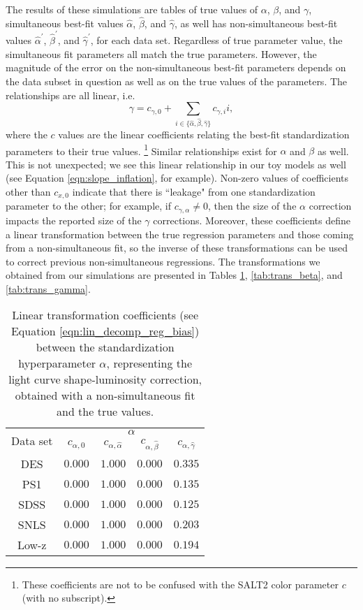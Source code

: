 The results of these simulations are tables of true values of $\alpha$, $\beta$, and $\gamma$, simultaneous best-fit values $\hat{\alpha}$, $\hat{\beta}$, and $\hat{\gamma}$, as well has non-simultaneous best-fit values $\hat{\alpha}^\prime$, $\hat{\beta}^\prime$, and $\hat{\gamma}^\prime$, for each data set. Regardless of true parameter value, the simultaneous fit parameters all match the true parameters. However, the magnitude of the error on the non-simultaneous best-fit parameters depends on the data subset in question as well as on the true values of the parameters. The relationships are all linear, i.e.
\begin{equation}
    \gamma = c_{\gamma, 0} + \displaystyle\sum_{i\in\{\hat{\alpha}, \hat{\beta}, \hat{\gamma}\}} c_{\gamma, i}i,
    \label{eqn:lin_decomp_reg_bias}
\end{equation}
where the $c$ values are the linear coefficients relating the best-fit standardization parameters to their true values. \footnote{These coefficients are not to be confused with the SALT2 color parameter $c$ (with no subscript).} Similar relationships exist for $\alpha$ and $\beta$ as well. This is not unexpected; we see this linear relationship in our toy models as well (see Equation \ref{eqn:slope_inflation}, for example). Non-zero values of coefficients other than $c_{x, 0}$ indicate that there is ``leakage" from one standardization parameter to the other; for example, if $c_{\gamma, \alpha} \neq 0$, then the size of the $\alpha$ correction impacts the reported size of the $\gamma$ corrections. Moreover, these coefficients define a linear transformation between the true regression parameters and those coming from a non-simultaneous fit, so the inverse of these transformations can be used to correct previous non-simultaneous regressions. The transformations we obtained from our simulations are presented in Tables \ref{tab:trans_alpha}, \ref{tab:trans_beta}, and \ref{tab:trans_gamma}.

\begin{table}[htbp]
\centering
    \begin{tabular}{ccccc}\toprule
    \multirow{2}{*}{Data set} &
    \multicolumn{4}{c}{$\alpha$}\\
       {}  &  $c_{\alpha, 0}$ & $c_{\alpha,\hat{\alpha}}$ & $c_{\alpha,\hat{\beta}}$ & $c_{\alpha,\hat{\gamma}}$\\\midrule
        DES & $0.000$ & $1.000$ & $0.000$ & $0.335$\\
        PS1 & $0.000$ & $1.000$ & $0.000$ & $0.135$\\
        SDSS & $0.000$ & $1.000$ & $0.000$ & $0.125$\\
        SNLS & $0.000$ & $1.000$ & $0.000$ & $0.203$\\
        Low-z & $0.000$ & $1.000$ & $0.000$ & $0.194$\\
    \bottomrule
    \end{tabular}
    \caption{Linear transformation coefficients (see Equation \ref{eqn:lin_decomp_reg_bias}) between the standardization hyperparameter $\alpha$, representing the light curve shape-luminosity correction, obtained with a non-simultaneous fit and the true values.}
    \label{tab:trans_alpha}
\end{table}

